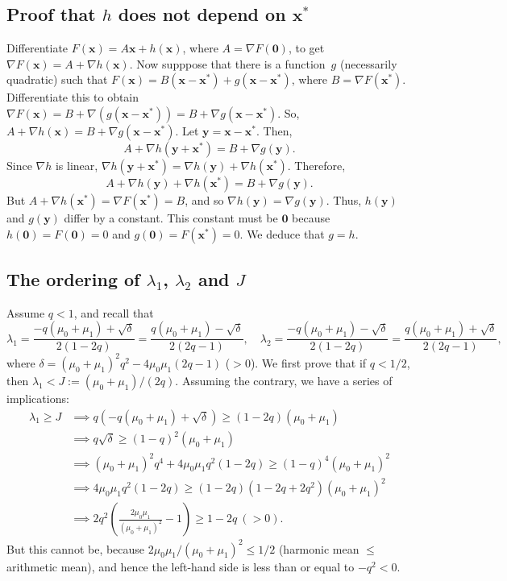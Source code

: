 \documentclass[12pt]{article}
\newcommand{\by}{\boldsymbol{y}}
\newcommand{\bzero}{\boldsymbol{0}}
\newcommand{\bx}{\boldsymbol{x}}
\begin{document}
\subsection{Proof that $h$ does not depend on $\bx^*$}
\label{appendix5}

Differentiate $F(\bx)=A\bx + h(\bx)$, where $A=\nabla F(\bzero)$, to get
$\nabla F(\bx)=A + \nabla h(\bx)$.
Now supppose that there is a function~$g$ (necessarily quadratic)
such that $F(\bx)=B(\bx-\bx^*) + g(\bx-\bx^*)$,
where $B= \nabla F(\bx^*)$. Differentiate this to obtain
$\nabla F(\bx)=B + \nabla (g(\bx-\bx^*)) = B+\nabla g(\bx-\bx^*)$.  So,
$A + \nabla h(\bx) =B + \nabla g(\bx-\bx^*)$.
Let $\by=\bx-\bx^*$. Then,
$$
A + \nabla h(\by+\bx^*) =B + \nabla g(\by).
$$
Since $\nabla h$ is linear,
$\nabla h(\by+\bx^*) = \nabla h(\by) + \nabla h(\bx^*)$. Therefore,
$$
A + \nabla h(\by) + \nabla h(\bx^*) =B + \nabla g(\by).
$$
But $A + \nabla h(\bx^*) = \nabla F(\bx^*)=B$, and so
$\nabla h(\by) = \nabla g(\by)$. Thus,
$h(\by)$ and $g(\by)$ differ by a constant. This constant must be
$\bzero$
because $h(\bzero)=F(\bzero)=0$ and $g(\bzero)=F(\bx^*)=0$.
We deduce that $g=h$.

\subsection{The ordering of $\lambda_1$, $\lambda_2$ and $J$}
\label{appendix6}

Assume $q<1$, and recall that
$$
\lambda_1
=\frac{-q(\mu_0+\mu_1)+\sqrt{\delta}}{2(1-2q)}
=\frac{q(\mu_0+\mu_1)-\sqrt{\delta}}{2(2q-1)},
\quad
\lambda_2
=\frac{-q(\mu_0+\mu_1)-\sqrt{\delta}}{2(1-2q)}
=\frac{q(\mu_0+\mu_1)+\sqrt{\delta}}{2(2q-1)},
$$
where
$\delta= (\mu_0 + \mu_1)^2 q^2 - 4\mu_0\mu_1 (2q-1)$ ($>0$).
We first prove that if $q<1/2$, then $\lambda_1<J:=(\mu_0+\mu_1)/(2q)$.
Assuming the contrary, we have a series of implications:
\begin{align*}
\lambda_1\geq J 
&\implies q(-q(\mu_0+\mu_1)+\sqrt{\delta})\geq (1-2q)(\mu_0+\mu_1)\\
&\implies q\sqrt{\delta} \geq (1-q)^2 (\mu_0+\mu_1)\\
&\implies (\mu_0+\mu_1)^2 q^4 + 4\mu_0\mu_1 q^2(1-2q) \geq  (1-q)^4
(\mu_0+\mu_1)^2\\
&\implies 4\mu_0\mu_1 q^2(1-2q) \geq (1-2q)(1-2q+2q^2)(\mu_0+\mu_1)^2\\
&\implies 2q^2
\left( \frac{2\mu_0\mu_1}{(\mu_0+\mu_1)^2}-1\right)\geq 1-2q \ (>0).
\end{align*}
But this cannot be, because
$2\mu_0\mu_1/(\mu_0+\mu_1)^2 \leq 1/2$ 
(harmonic mean $\leq$ arithmetic mean),
and hence the left-hand side is less than or equal to $-q^2<0$.
\end{document}
